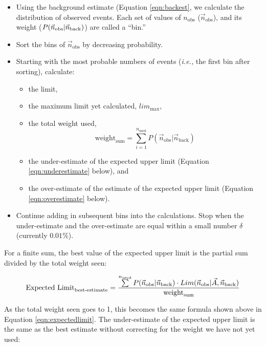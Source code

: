 \begin{itemize}

\item Using the background estimate (Equation \ref{eqn:backest}, we
  calculate the distribution of observed events.  Each set of values
  of $n_\text{obs}$ ($\vec{n}_\text{obs}$), and its weight
  ($P(\vec{n}_\text{obs}|\vec{n}_\text{back})$) are called a ``bin.''

\item Sort the bins of $\vec{n}_\text{obs}$ by decreasing probability.

\item Starting with the most probable numbers of events ({\em i.e.,}
  the first bin after sorting), calculate:
 
  \begin{itemize}

    \item the limit, 
    \item the maximum limit yet calculated, $lim_\text{max}$,
    \item the total weight used, \[\text{weight}_\text{sum} = \sum^{n_\text{used}}_{i=1} P(\vec{n}_\text{obs}|\vec{n}_\text{back})\]
    \item the under-estimate of the expected upper limit (Equation
      \ref{eqn:underestimate} below), and
    \item the over-estimate of the estimate of the expected upper limit (Equation
      \ref{eqn:overestimate} below).

  \end{itemize}

\item Continue adding in subsequent bins into the calculations.  Stop
  when the under-estimate and the over-estimate are equal within a
  small number $\delta$ (currently $0.01\%$).

\end{itemize}

For a finite sum, the best value of the expected upper limit is the partial sum divided by the total weight seen:

\begin{equation}
 \text{Expected Limit}_\text{best-estimate} = \frac{\sum\limits^{n_\text{used}}
P(\xobs|\vec{n}_\text{back})\cdot Lim(\xobs|\vec{A},\vec{n}_\text{back})}{ \text{weight}_\text{sum}}
\end{equation}


As the total weight seen goes to 1, this becomes the same formula
shown above in Equation \ref{eqn:expectedlimit}.  The under-estimate
of the expected upper limit is the same as the best estimate without
correcting for the weight we have not yet used:

